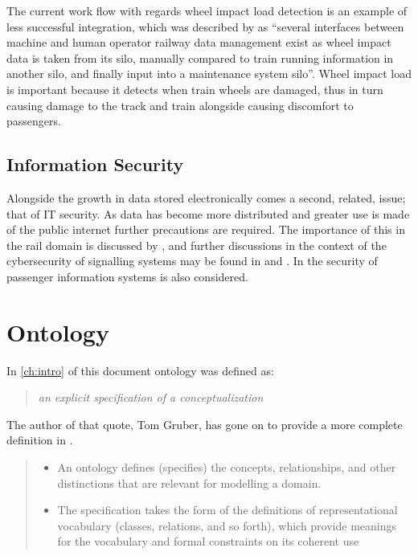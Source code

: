 The current work flow with regards wheel impact load detection is an example of less successful integration, which was described by \citet{Tutcher2015} as  ``several interfaces between machine and human operator railway data management exist as wheel impact data is taken from its silo, manually compared to train running information in another silo, and finally input into a maintenance system silo''. Wheel impact load is important because it detects when train wheels are damaged, thus in turn causing damage to the track and train alongside causing discomfort to passengers.

\subsection{Information Security}

Alongside the growth in data stored electronically comes a second, related, issue; that of IT security. As data has become more distributed and greater use is made of the public internet further precautions are required. The importance of this in the rail domain is discussed by \citet{Depar2016}, and further discussions in the context of the cybersecurity of signalling systems may be found in \citep{BloomField2016} and \citep{Chen2015}. In \citet{Chen2015} the security of passenger information systems is also considered.

\section{Ontology}\label{onto}
In \autoref{ch:intro} of this document ontology was defined as: 
\begin{quote}
\emph{an explicit specification of a conceptualization}
\end{quote}
The author of that quote, Tom Gruber, has gone on to provide a more complete definition in \citep{Gru09}. 

\begin{quote}
\begin{itemize}
\item An ontology defines (specifies) the concepts, relationships, and other distinctions that are relevant for modelling a domain.
\item The specification takes the form of the definitions of representational vocabulary (classes, relations, and so forth), which provide meanings for the vocabulary and formal constraints on its coherent use
\end{itemize}
\end{quote}

